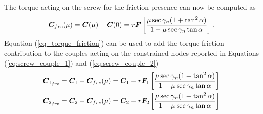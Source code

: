 The torque acting on the screw for the friction presence
can now be computed as
\begin{equation}
  \bm{C}_{frc}(\mu)=\bm{C}(\mu)-\bm{C}(0)=r\bm{F}\left[\frac{\mu\sec{\gamma_n}(1+\tan^2{\alpha})}{1-\mu\sec{\gamma_n}\tan{\alpha}}\right].
  \label{eq_torque_friction}
\end{equation}
Equation (\ref{eq_torque_friction}) can be used to add
the torque friction contribution to the couples acting on the constrained
nodes reported in Equations (\ref{eq:screw_couple_1}) and (\ref{eq:screw_couple_2})
\begin{align}
  \bm{C}_{1_{frc}}=\bm{C}_1-\bm{C}_{frc}(\mu)= \bm{C}_1-r\bm{F}_1\left[\frac{\mu\sec{\gamma_n}(1+\tan^2{\alpha})}{1-\mu\sec{\gamma_n}\tan{\alpha}}\right] 
  \label{eq:screw_couple_tot_1}
  \\
  \bm{C}_{2_{frc}}=\bm{C}_2-\bm{C}_{frc}(\mu)= \bm{C}_2-r\bm{F}_2\left[\frac{\mu\sec{\gamma_n}(1+\tan^2{\alpha})}{1-\mu\sec{\gamma_n}\tan{\alpha}}\right] 
  \label{eq:screw_couple_tot_2}
\end{align}

